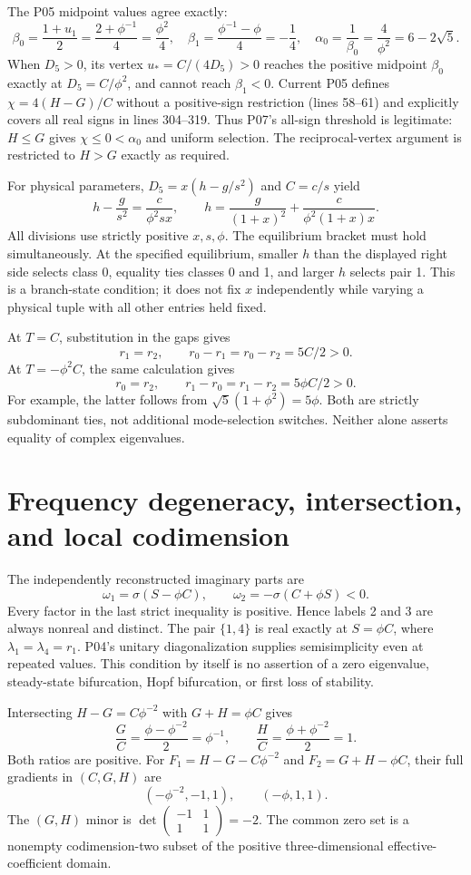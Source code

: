 \documentclass[11pt]{article}
\begin{document}
The P05 midpoint values agree exactly:
\[
 \beta_0=\frac{1+u_1}{2}=\frac{2+\phi^{-1}}4=\frac{\phi^2}{4},
 \quad \beta_1=\frac{\phi^{-1}-\phi}{4}=-\frac14,
 \quad \alpha_0=\frac1{\beta_0}=\frac4{\phi^2}=6-2\sqrt5.
\]
When $D_5>0$, its vertex $u_*=C/(4D_5)>0$ reaches the positive
midpoint $\beta_0$ exactly at $D_5=C/\phi^2$, and cannot reach
$\beta_1<0$. Current P05 defines $\chi=4(H-G)/C$ without a
positive-sign restriction (lines 58--61) and explicitly covers all real
signs in lines 304--319. Thus P07's all-sign threshold is legitimate:
$H\le G$ gives $\chi\le0<\alpha_0$ and uniform selection. The
reciprocal-vertex argument is restricted to $H>G$ exactly as required.

For physical parameters, $D_5=x(h-g/s^2)$ and $C=c/s$ yield
\[
 h-\frac{g}{s^2}=\frac{c}{\phi^2sx},\qquad
 \boxed{h=\frac{g}{(1+x)^2}+\frac{c}{\phi^2(1+x)x}.}
\]
All divisions use strictly positive $x,s,\phi$. The equilibrium bracket
must hold simultaneously. At the specified equilibrium, smaller $h$
than the displayed right side selects class 0, equality ties classes
0 and 1, and larger $h$ selects pair 1. This is a branch-state
condition; it does not fix $x$ independently while varying a physical
tuple with all other entries held fixed.

At $T=C$, substitution in the gaps gives
\[
 r_1=r_2,\qquad r_0-r_1=r_0-r_2=5C/2>0.
\]
At $T=-\phi^2C$, the same calculation gives
\[
 r_0=r_2,\qquad r_1-r_0=r_1-r_2=5\phi C/2>0.
\]
For example, the latter follows from
$\sqrt5(1+\phi^2)=5\phi$. Both are strictly subdominant ties,
not additional mode-selection switches. Neither alone asserts equality
of complex eigenvalues.

\section{Frequency degeneracy, intersection, and local codimension}
\label{sec:frequency}
The independently reconstructed imaginary parts are
\[
 \omega_1=\sigma(S-\phi C),\qquad
 \omega_2=-\sigma(C+\phi S)<0.
\]
Every factor in the last strict inequality is positive. Hence labels
2 and 3 are always nonreal and distinct. The pair $\{1,4\}$ is real
exactly at $S=\phi C$, where $\lambda_1=\lambda_4=r_1$.
P04's unitary diagonalization supplies semisimplicity even at repeated
values. This condition by itself is no assertion of a zero eigenvalue,
steady-state bifurcation, Hopf bifurcation, or first loss of stability.

Intersecting $H-G=C\phi^{-2}$ with $G+H=\phi C$ gives
\[
 \frac GC=\frac{\phi-\phi^{-2}}2=\phi^{-1},\qquad
 \frac HC=\frac{\phi+\phi^{-2}}2=1.
\]
Both ratios are positive. For
$F_1=H-G-C\phi^{-2}$ and $F_2=G+H-\phi C$, their full
gradients in $(C,G,H)$ are
\[
 (-\phi^{-2},-1,1),\qquad (-\phi,1,1).
\]
The $(G,H)$ minor is
$\det\left(\begin{smallmatrix}-1&1\\1&1\end{smallmatrix}\right)=-2$.
The common zero set is a nonempty codimension-two subset of the
positive three-dimensional effective-coefficient domain.
\end{document}
